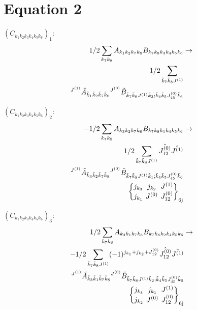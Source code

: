 \documentclass[11pt]{article}
\newcommand{\sixj}[6]{\begingroup\setlength{\arraycolsep}{0.2em}\begin{Bmatrix} #1 & #2 & #3 \\ #4 & #5 & #6 \end{Bmatrix}_{\text{6j}}\endgroup}
\begin{document}
\section{Equation 2}
$\left({C}_{{k}_{1}{k}_{2}{k}_{3}{k}_{4}{k}_{5}{k}_{6}}\right)_{1}$:
\begin{align}
1/2\sum_{{k}_{7}{k}_{8}}{A}_{{k}_{1}{k}_{2}{k}_{7}{k}_{8}}{B}_{{k}_{7}{k}_{8}{k}_{3}{k}_{4}{k}_{5}{k}_{6}}&\rightarrow \notag \\1/2\sum_{\tilde{k}_{7}\tilde{k}_{8}J^{(1)}}& \notag \\{}^{J^{(1)}}\tilde{A}_{\tilde{k}_{1}\tilde{k}_{2}\tilde{k}_{7}\tilde{k}_{8}}{}^{J^{(0)}}\tilde{B}_{\tilde{k}_{7}\tilde{k}_{8}J^{(1)}\tilde{k}_{3};\tilde{k}_{4}\tilde{k}_{5}J^{(0)}_{45}\tilde{k}_{6}}& \notag \\
\end{align}

$\left({C}_{{k}_{1}{k}_{2}{k}_{3}{k}_{4}{k}_{5}{k}_{6}}\right)_{2}$:
\begin{align}
-1/2\sum_{{k}_{7}{k}_{8}}{A}_{{k}_{3}{k}_{2}{k}_{7}{k}_{8}}{B}_{{k}_{7}{k}_{8}{k}_{1}{k}_{4}{k}_{5}{k}_{6}}&\rightarrow \notag \\1/2\sum_{\tilde{k}_{7}\tilde{k}_{8}J^{(1)}}\hat{J^{(0)}_{12}}\hat{J^{(1)}}& \notag \\{}^{J^{(1)}}\tilde{A}_{\tilde{k}_{3}\tilde{k}_{2}\tilde{k}_{7}\tilde{k}_{8}}{}^{J^{(0)}}\tilde{B}_{\tilde{k}_{7}\tilde{k}_{8}J^{(1)}\tilde{k}_{1};\tilde{k}_{4}\tilde{k}_{5}J^{(0)}_{45}\tilde{k}_{6}}& \notag \\\sixj{j_{{k}_{3}}}{j_{{k}_{2}}}{J^{(1)}}{j_{{k}_{1}}}{J^{(0)}}{J^{(0)}_{12}}
\end{align}

$\left({C}_{{k}_{1}{k}_{2}{k}_{3}{k}_{4}{k}_{5}{k}_{6}}\right)_{3}$:
\begin{align}
1/2\sum_{{k}_{7}{k}_{8}}{A}_{{k}_{3}{k}_{1}{k}_{7}{k}_{8}}{B}_{{k}_{7}{k}_{8}{k}_{2}{k}_{4}{k}_{5}{k}_{6}}&\rightarrow \notag \\-1/2\sum_{\tilde{k}_{7}\tilde{k}_{8}J^{(1)}}(-1)^{j_{{k}_{1}} +j_{{k}_{2}} +J^{(0)}_{12} }\hat{J^{(0)}_{12}}\hat{J^{(1)}}& \notag \\{}^{J^{(1)}}\tilde{A}_{\tilde{k}_{3}\tilde{k}_{1}\tilde{k}_{7}\tilde{k}_{8}}{}^{J^{(0)}}\tilde{B}_{\tilde{k}_{7}\tilde{k}_{8}J^{(1)}\tilde{k}_{2};\tilde{k}_{4}\tilde{k}_{5}J^{(0)}_{45}\tilde{k}_{6}}& \notag \\\sixj{j_{{k}_{3}}}{j_{{k}_{1}}}{J^{(1)}}{j_{{k}_{2}}}{J^{(0)}}{J^{(0)}_{12}}
\end{align}
\end{document}
